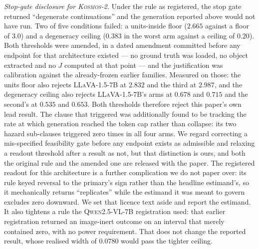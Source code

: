 \begin{enumerate}
\emph{Stop-gate disclosure for \textsc{Kosmos-2}.} Under the rule as registered, the stop gate
returned ``degenerate continuations'' and the generation reported above would not have run. Two
of five conditions failed: a units-inside floor ($2.665$ against a floor of $3.0$) and a degeneracy
ceiling ($0.383$ in the worst arm against a ceiling of $0.20$). Both thresholds were amended, in a
dated amendment committed before any endpoint for that architecture existed --- no ground truth was
loaded, no object extracted and no $J$ computed at that point --- and the justification was
calibration against the already-frozen earlier families. Measured on those: the units floor also
rejects \textsc{LLaVA-1.5-7B} at $2.832$ and the third at $2.987$, and the degeneracy ceiling also
rejects \textsc{LLaVA-1.5-7B}'s arms at $0.678$ and $0.715$ and the second's at $0.535$ and $0.653$.
Both thresholds therefore reject this paper's own lead result. The clause that triggered was
additionally found to be tracking the rate at which generation reached the token cap rather than
collapse: its two hazard sub-clauses triggered zero times in all four arms. We regard correcting a
mis-specified feasibility gate before any endpoint exists as admissible and relaxing a readout
threshold after a result as not, but that distinction is ours, and both the original rule and the
amended one are released with the paper. The registered readout for this architecture is a further
complication we do not paper over: its rule keyed reversal to the primary's sign rather than the
headline estimand's, so it mechanically returns ``replicates'' while the estimand it was meant to
govern excludes zero downward. We set that licence text aside and report the estimand. It also tightens a rule the \textsc{Qwen2.5-VL-7B} registration used: that earlier
registration returned an image-inert outcome on an interval that merely contained zero, with no power
requirement. That does not change the reported result, whose realised width of $0.0780$ would pass
the tighter ceiling.


\end{enumerate}
